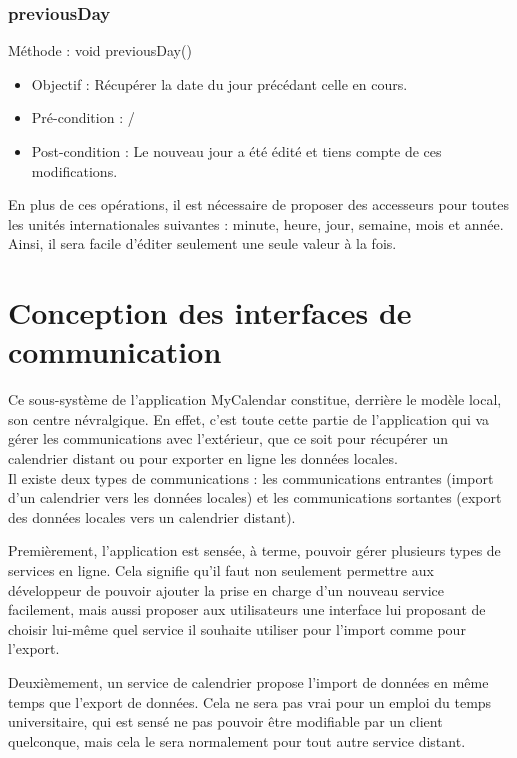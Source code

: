    		\subsection*{previousDay}
            Méthode : void previousDay()
			\begin{itemize}
				\item Objectif : Récupérer la date du jour précédant celle en cours.
				\item Pré-condition : /
				\item Post-condition : Le nouveau jour a été édité et tiens compte de ces modifications.
        \newline
			\end{itemize}
        En plus de ces opérations, il est nécessaire de proposer des accesseurs pour toutes les unités internationales suivantes : minute, heure, jour, semaine, mois et année. Ainsi, il sera facile d'éditer seulement une seule valeur à la fois.

\chapter{Conception des interfaces de communication}
	Ce sous-système de l'application MyCalendar constitue, derrière le modèle local, son centre névralgique. En effet, c'est toute cette partie de l'application qui va gérer les communications avec l'extérieur, que ce soit pour récupérer un calendrier distant ou pour exporter en ligne les données locales.\\
	
	Il existe deux types de communications : les communications entrantes (import d'un calendrier vers les données locales) et les communications sortantes (export des données locales vers un calendrier distant).
	
	Premièrement, l'application est sensée, à terme, pouvoir gérer plusieurs types de services en ligne. Cela signifie qu'il faut non seulement permettre aux développeur de pouvoir ajouter la prise en charge d'un nouveau service facilement, mais aussi proposer aux utilisateurs une interface lui proposant de choisir lui-même quel service il souhaite utiliser pour l'import comme pour l'export.
	
	Deuxièmement, un service de calendrier propose l'import de données en même temps que l'export de données. Cela ne sera pas vrai pour un emploi du temps universitaire, qui est sensé ne pas pouvoir être modifiable par un client quelconque, mais cela le sera normalement pour tout autre service distant.
	
